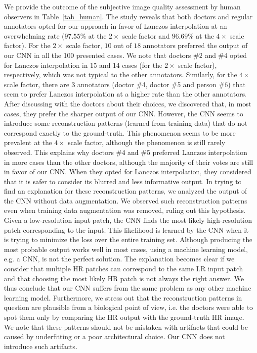 \documentclass{ieeeaccess}
\begin{document}
We provide the outcome of the subjective image quality assessment by human observers in Table~\ref{tab_human}. The study reveals that both doctors and regular annotators opted for our approach in favor of Lanczos interpolation at an overwhelming rate ($97.55\%$ at the $2\times$ scale factor and $96.69\%$ at the $4\times$ scale factor). For the $2\times$ scale factor, $10$ out of $18$ annotators preferred the output of our CNN in all the 100 presented cases. We note that doctors \#2 and \#4 opted for Lanczos interpolation in 15 and 14 cases (for the $2\times$ scale factor), respectively, which was not typical to the other annotators. Similarly, for the $4\times$ scale factor, there are 3 annotators (doctor \#4, doctor \#5 and person \#6) that seem to prefer Lanczos interpolation at a higher rate than the other annotators. After discussing with the doctors about their choices, we discovered that, in most cases, they prefer the sharper output of our CNN. However, the CNN seems to introduce some reconstruction patterns (learned from training data) that do not correspond exactly to the ground-truth. This phenomenon seems to be more prevalent at the $4\times$ scale factor, although the phenomenon is still rarely observed. This explains why doctors \#4 and \#5 preferred Lanczos interpolation in more cases than the other doctors, although the majority of their votes are still in favor of our CNN. When they opted for Lanczos interpolation, they considered that it is safer to consider its blurred and less informative output. In trying to find an explanation for these reconstruction patterns, we analyzed the output of the CNN without data augmentation. We observed such reconstruction patterns even when training data augmentation was removed, ruling out this hypothesis. Given a low-resolution input patch, the CNN finds the most likely high-resolution patch corresponding to the input. This likelihood is learned by the CNN when it is trying to minimize the loss over the entire training set. Although producing the most probable output works well in most cases, using a machine learning model, e.g. a CNN, is not the perfect solution. The explanation becomes clear if we consider that multiple HR patches can correspond to the same LR input patch and that choosing the most likely HR patch is not always the right answer. We thus conclude that our CNN suffers from the same problem as any other machine learning model. Furthermore, we stress out that the reconstruction patterns in question are plausible from a biological point of view, i.e. the doctors were able to spot them only by comparing the HR output with the ground-truth HR image. We note that these patterns should not be mistaken with artifacts that could be caused by underfitting or a poor architectural choice. Our CNN does not introduce such artifacts.
\end{document}
